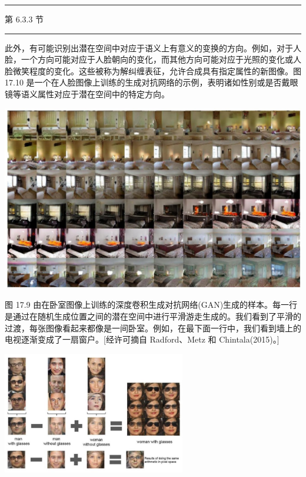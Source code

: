 \documentclass[10pt]{article}
\newcommand{\HRule}{\begin{center}\rule{0.9\linewidth}{0.2mm}\end{center}}
\begin{document}
\HRule

第 6.3.3 节

\HRule

此外，有可能识别出潜在空间中对应于语义上有意义的变换的方向。例如，对于人脸，一个方向可能对应于人脸朝向的变化，而其他方向可能对应于光照的变化或人脸微笑程度的变化。这些被称为解纠缠表征，允许合成具有指定属性的新图像。图 17.10 是一个在人脸图像上训练的生成对抗网络的示例，表明诸如性别或是否戴眼镜等语义属性对应于潜在空间中的特定方向。

\begin{center}
\includegraphics[max width=1.0\textwidth]{images/0194e279-9b28-703a-88f4-c3ac21e2010d_562_232_351_1291_782_0.jpg}
\end{center}
\hspace*{3em} 

图 17.9 由在卧室图像上训练的深度卷积生成对抗网络(GAN)生成的样本。每一行是通过在随机生成位置之间的潜在空间中进行平滑游走生成的。我们看到了平滑的过渡，每张图像看起来都像是一间卧室。例如，在最下面一行中，我们看到墙上的电视逐渐变成了一扇窗户。[经许可摘自 Radford、Metz 和 Chintala(2015)。]

\begin{center}
\includegraphics[max width=0.6\textwidth]{images/0194e279-9b28-703a-88f4-c3ac21e2010d_562_709_1479_795_529_0.jpg}
\end{center}
\hspace*{3em} 
\end{document}
